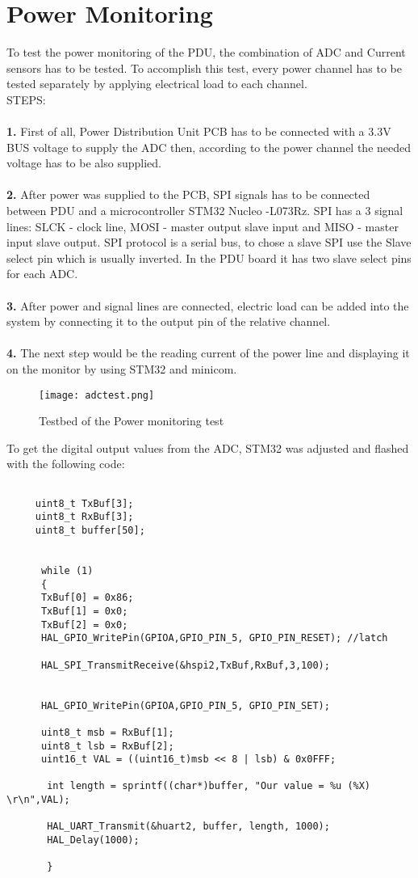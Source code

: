 	
	\section{Power Monitoring}
	
	To test the power monitoring of the PDU, the combination of ADC and Current sensors has to be tested. To accomplish this test, every power channel has to be tested separately by applying electrical load to each channel. \\
	
	STEPS:\\ \\
	\textbf{1.} First of all, Power Distribution Unit PCB has to be connected with a 3.3V BUS voltage to supply the ADC then, according to the power channel the needed voltage has to be also supplied. \\ \\
	\textbf{2.} After power  was supplied to the PCB, SPI signals has to be connected between PDU and a microcontroller STM32 Nucleo -L073Rz. SPI has a 3 signal lines: SLCK - clock line, MOSI - master output slave input and MISO - master input slave output. SPI protocol is a serial bus, to chose a slave SPI use the Slave select pin which is usually inverted. In the PDU board it has two slave select pins for each ADC.\\ \\
	\textbf{3.} After power and signal lines are connected, electric load can be added into the system by connecting it to the output pin of the relative channel.\\ \\
	\textbf{4.} The next step would be the reading current of the power line and displaying it on the monitor by using STM32 and minicom.
	  
	\begin{figure}[h]
		\centering
		\texttt{[image: adctest.png]}
		\caption{Testbed of the Power monitoring test}
		\label{fig: adctest}
	\end{figure}
	 
	 To get the digital output values from the ADC, STM32 was adjusted and flashed with the following code:
	 
	
	 \begin{lstlisting}

	 uint8_t TxBuf[3];
	 uint8_t RxBuf[3];
	 uint8_t buffer[50];
	

	  while (1)
	  {
	  TxBuf[0] = 0x86;
	  TxBuf[1] = 0x0;
	  TxBuf[2] = 0x0;
	  HAL_GPIO_WritePin(GPIOA,GPIO_PIN_5, GPIO_PIN_RESET); //latch 
	  
	  HAL_SPI_TransmitReceive(&hspi2,TxBuf,RxBuf,3,100);
	  
	  
	  HAL_GPIO_WritePin(GPIOA,GPIO_PIN_5, GPIO_PIN_SET);
	  
	  uint8_t msb = RxBuf[1];
	  uint8_t lsb = RxBuf[2];
	  uint16_t VAL = ((uint16_t)msb << 8 | lsb) & 0x0FFF;
	  
	   int length = sprintf((char*)buffer, "Our value = %u (%X) \r\n",VAL);
	   
	   HAL_UART_Transmit(&huart2, buffer, length, 1000);
	   HAL_Delay(1000);
	   
	   }
	 \end{lstlisting}
	 
